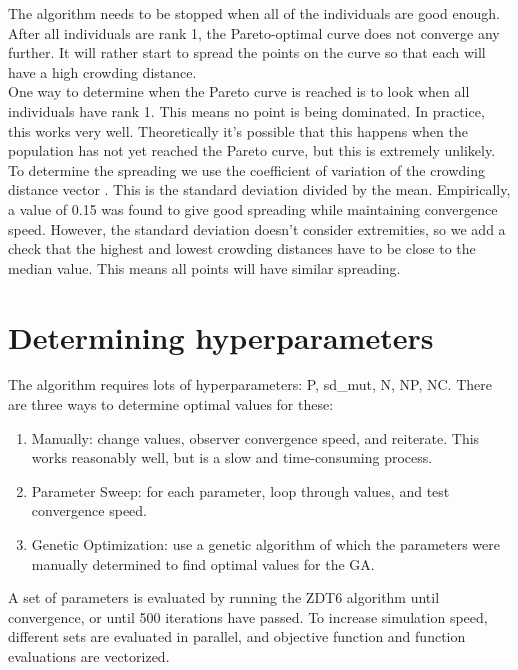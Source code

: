 The algorithm needs to be stopped when all of the individuals are good enough. After all individuals are rank 1, the Pareto-optimal curve does not converge any further. It will rather start to spread the points on the curve so that each will have a high crowding distance. \\
One way to determine when the Pareto curve is reached is to look when all individuals have rank 1. This means no point is being dominated. In practice, this works very well. Theoretically it's possible that this happens when the population has not yet reached the Pareto curve, but this is extremely unlikely.
To determine the spreading we use the coefficient of variation of the crowding distance vector \cite{CV}. This is the standard deviation divided by the mean. Empirically, a value of 0.15 was found to give good spreading while maintaining convergence speed. However, the standard deviation doesn't consider extremities, so we add a check that the highest and lowest crowding distances have to be close to the median value. This means all points will have similar spreading.

\section{Determining hyperparameters} \label{hyperparameters}
The algorithm requires lots of hyperparameters: P, sd_mut, N, NP, NC. There are three ways to determine optimal values for these:
\begin{enumerate}
\item Manually: change values, observer convergence speed, and reiterate. This works reasonably well, but is a slow and time-consuming process.
\item Parameter Sweep: for each parameter, loop through values, and test convergence speed.
\item Genetic Optimization: use a genetic algorithm of which the parameters were manually determined to find optimal values for the GA.
\end{enumerate}
A set of parameters is evaluated by running the ZDT6 algorithm until convergence, or until 500 iterations have passed. To increase simulation speed, different sets are evaluated in parallel, and objective function and function evaluations are vectorized.

